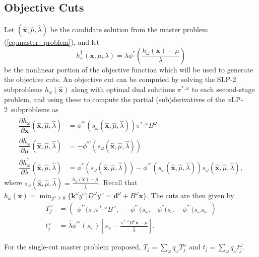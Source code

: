 \documentclass[ijoc,nonblindrev]{informs3} %
\newcommand{\x}{\mathbf{x}}
\newcommand{\xh}{\hat{\x}}
\newcommand{\lh}{\hat{\lambda}}
\newcommand{\mh}{\hat{\mu}}
\renewcommand{\k}{\mathbf{k}}
\renewcommand{\d}{\mathbf{d}}
\newcommand{\plp}{$\phi$LP-2}
\begin{document}
\subsection{Objective Cuts}

Let $(\xh,\mh, \lh)$ be the candidate solution from the master problem (\ref{eq:master_problem}), and let 
\[
	h^\dagger_\omega(\x,\mu,\lambda) = \lambda \phi^*\left(\frac{h_\omega(\x) - \mu}{\lambda}\right)
\]
be the nonlinear portion of the objective function which will be used to generate the objective cuts.
An objective cut can be computed by solving the SLP-2 subproblems $h_\omega(\xh)$ along with optimal dual solutions $\pi^{*,\omega}$ to each second-stage problem, and using these to compute the partial (sub)derivatives of the \plp\ subproblems as
\begin{align*}
	\dfrac{\partial h^\dagger_\omega}{\partial \x}(\xh,\mh,\lh) & = \phi^{*\prime}(s_\omega(\xh,\mh,\lh)) \pi^{*,\omega}B^\omega \\
	\dfrac{\partial h^\dagger_\omega}{\partial \mu}(\xh,\mh,\lh) & = -\phi^{*\prime}(s_\omega(\xh,\mh,\lh)) \\
	\dfrac{\partial h^\dagger_\omega}{\partial \lambda}(\xh,\mh,\lh) & = \phi^*(s_\omega(\xh,\mh,\lh)) - \phi^{*\prime}(s_\omega(\xh,\mh,\lh))s_\omega(\xh,\mh,\lh),
\end{align*}
where $s_\omega(\xh,\mh,\lh) = \frac{h_\omega(\xh) - \mh}{\lh}$.
Recall that $h_\omega(\x) = \min_{y^\omega \geq 0} \{\k^\omega y^\omega | D^\omega y^\omega = \d^\omega + B^\omega \x\}$.
The cuts are then given by
\begin{align*}
	T_j^\omega & = 
	\left( \begin{array}{ccc}
		\phi^{*\prime}(s_\omega \pi^{*,\omega}B^\omega, 
			 & -\phi^{*\prime}(s_\omega, 
			 & \phi^*(s_\omega - \phi^{*\prime}(s_\omega s_\omega
	\end{array} \right) \\
	t_j^\omega & = \lh \phi^{*\prime}(s_\omega)\left[s_\omega - \frac{\pi^{*,\omega}B^\omega\xh - \mh}{\lh}\right].
\end{align*}

For the single-cut master problem proposed, $T_j = \sum_\omega q_\omega T_j^\omega$ and $t_j = \sum_\omega q_\omega t_j^\omega$.
\end{document}
